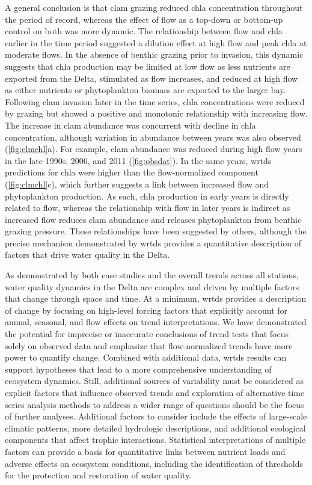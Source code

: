 \documentclass[journal = esthag, manuscript = article]{achemso}\usepackage[]{graphicx}\usepackage[]{color}
\begin{document}
A general conclusion is that clam grazing reduced \ac{chla} concentration throughout the period of record, whereas the effect of flow as a top-down or bottom-up control on both was more dynamic.  The relationship between flow and \ac{chla} earlier in the time period suggested a dilution effect at high flow and peak \ac{chla} at moderate flows. In the absence of benthic grazing prior to invasion, this dynamic suggests that \ac{chla} production may be limited at low flow as less nutrients are exported from the Delta, stimulated as flow increases, and reduced at high flow as either nutrients or phytoplankton biomass are exported to the larger bay. Following clam invasion later in the time series, \ac{chla} concentrations were reduced by grazing but showed a positive and monotonic relationship with increasing flow. The increase in clam abundance was concurrent with decline in \ac{chla} concentration, although variation in abundance between years was also observed (\ref{fig:clmchl}a).  For example, clam abundance was reduced during high flow years in the late 1990s, 2006, and 2011 (\cref{fig:obsdat}). In the same years, \ac{wrtds} predictions for \ac{chla} were higher than the flow-normalized component (\cref{fig:clmchl}c), which further suggests a link between increased flow and phytoplankton production.  As such, \ac{chla} production in early years is directly related to flow, whereas the relationship with flow in later years is indirect as increased flow reduces clam abundance and releases phytoplankton from benthic grazing pressure. These relationships have been suggested by others\cite{Alpine92,Parchaso02,Jassby08}, although the precise mechanism demonstrated by \ac{wrtds} provides a quantitative description of factors that drive water quality in the Delta.

As demonstrated by both case studies and the overall trends across all stations, water quality dynamics in the Delta are complex and driven by multiple factors that change through space and time.  At a minimum, \ac{wrtds} provides a description of change by focusing on high-level forcing factors that explicitly account for annual, seasonal, and flow effects on trend interpretations.  We have demonstrated the potential for imprecise or inaccurate conclusions of trend tests that focus solely on observed data and emphasize that flow-normalized trends have more power to quantify change.  Combined with additional data, \ac{wrtds} results can support hypotheses that lead to a more comprehensive understanding of ecosystem dynamics. Still, additional sources of variability must be considered as explicit factors that influence observed trends and exploration of alternative time series analysis methods to address a wider range of questions should be the focus of further analyses.  Additional factors to consider include the effects of large-scale climatic patterns, more detailed hydrologic descriptions, and additional ecological components that affect trophic interactions.  Statistical interpretations of multiple factors can provide a basis for quantitative links between nutrient loads and adverse effects on ecosystem conditions, including the identification of thresholds for the protection and restoration of water quality. 
\end{document}
